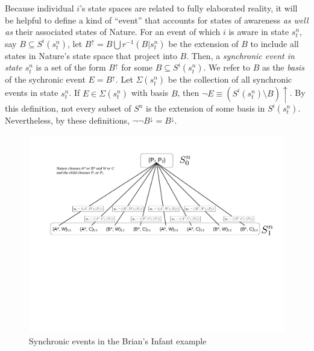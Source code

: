 \documentclass[
11pt,
titlepage,
reqno,
]{article}%
\theoremstyle{definition}
\begin{document}
	
	
	Because individual $i$'s state spaces are related to fully elaborated reality, it will be helpful to define a kind of ``event'' that  accounts for states of awareness \textit{as well as} their associated states of Nature.
	For an event of which $i$ is aware in state $s^n_t$, say $B\subseteq S^i(s^n_t)$, let $B^{\uparrow}=B\bigcup r^{-1}(B|s^n_t)$ be the extension of $B$ to include all states in Nature's state space that project into $B$.
	Then, a \textit{synchronic event in state $s^n_t$} is a set of the form $B^{\uparrow}$ for some $B\subseteq S^i(s^n_t)$.
	We refer to  $B$ as the \textit{basis} of the sychronic event $E=B^{\uparrow}$.
	Let $\Sigma(s^n_t)$ be the collection of all synchronic events in state $s^n_t$.
	If $E\in \Sigma(s^n_t)$ with basis $B$, then $\neg E\equiv(S^i(s^n_t)\setminus B)\uparrow$. 
	By this definition, not every subset of $S^n$ is the extension of some basis in $S^i(s^n_t)$.
	Nevertheless, by these definitions,  $\lnot\lnot B^\downarrow = B^\downarrow$.
	
	
	\begin{figure}[h!]
		\centering
		\includegraphics*[page=4,trim = 0in 3.5in 1.5in 0in,scale=.7]{Awareness_Diagrams_All}
		\caption{Synchronic events in the Brian's Infant example\label{Diag: p-04}}%
	\end{figure}
	
\end{document}
